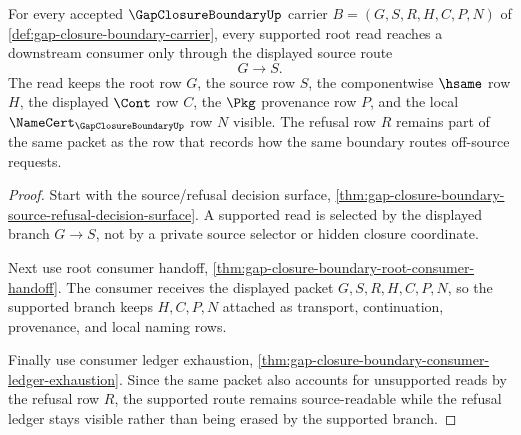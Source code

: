 \begin{theorem}
\label{thm:gap-closure-boundary-supported-source-route-readiness}
For every accepted $\GapClosureBoundaryUp$ carrier $B=(G,S,R,H,C,P,N)$ of \autoref{def:gap-closure-boundary-carrier}, every supported root read reaches a downstream consumer only through the displayed source route
$$
G \longrightarrow S.
$$
The read keeps the root row $G$, the source row $S$, the componentwise $\hsame$ row $H$, the displayed $\Cont$ row $C$, the $\Pkg$ provenance row $P$, and the local $\NameCert_{\GapClosureBoundaryUp}$ row $N$ visible. The refusal row $R$ remains part of the same packet as the row that records how the same boundary routes off-source requests.
\end{theorem}
\begin{proof}
Start with the source/refusal decision surface, \autoref{thm:gap-closure-boundary-source-refusal-decision-surface}. A supported read is selected by the displayed branch $G \longrightarrow S$, not by a private source selector or hidden closure coordinate.

Next use root consumer handoff, \autoref{thm:gap-closure-boundary-root-consumer-handoff}. The consumer receives the displayed packet $G,S,R,H,C,P,N$, so the supported branch keeps $H,C,P,N$ attached as transport, continuation, provenance, and local naming rows.

Finally use consumer ledger exhaustion, \autoref{thm:gap-closure-boundary-consumer-ledger-exhaustion}. Since the same packet also accounts for unsupported reads by the refusal row $R$, the supported route remains source-readable while the refusal ledger stays visible rather than being erased by the supported branch.
\end{proof}

